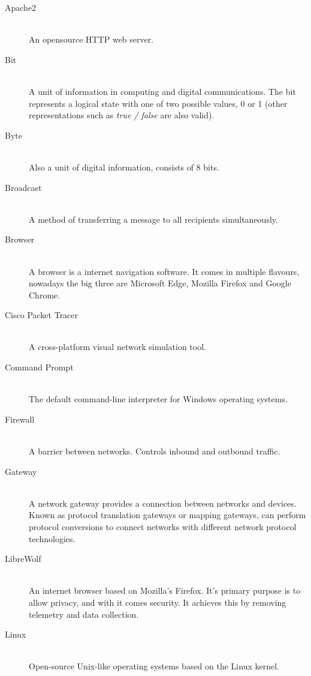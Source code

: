 \documentclass[11pt,a4paper]{report}
\begin{document}
    \begin{description}
        \item[Apache2] \hfill \\
            An opensource HTTP web server.
        \item[Bit] \hfill \\
            A unit of information in computing and digital communications. The bit represents a logical state with one of two possible values, 0 or 1 (other representations such as \textit{true / false} are also valid).
        \item[Byte] \hfill \\
            Also a unit of digital information, consists of 8 bits.
        \item[Broadcast] \hfill \\
            A method of transferring a message to all recipients simultaneously.
        \item[Browser] \hfill \\
            A browser is a internet navigation software. It comes in multiple flavours, nowadays the big three are Microsoft Edge, Mozilla Firefox and Google Chrome.
        \item[Cisco Packet Tracer] \hfill \\
            A cross-platform visual network simulation tool.
        \item[Command Prompt] \hfill \\
            The default command-line interpreter for Windows operating systems.
        \item[Firewall] \hfill \\
            A barrier between networks. Controls inbound and outbound traffic.
        \item[Gateway] \hfill \\
            A network gateway provides a connection between networks and devices. Known as protocol translation gateways or mapping gateways, can perform protocol conversions to connect networks with different network protocol technologies.
        \item[LibreWolf] \hfill \\
            An internet browser based on Mozilla's Firefox. It's primary purpose is to allow privacy, and with it comes security. It achieves this by removing telemetry and data collection.
        \item[Linux] \hfill \\
            Open-source Unix-like operating systems based on the Linux kernel.

\end{description}
\end{document}
